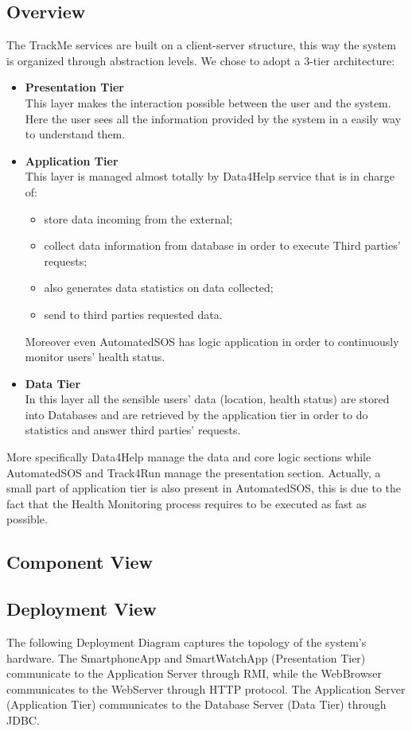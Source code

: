\subsection{Overview}
The TrackMe services are built on a client-server structure, this way the system is organized through abstraction levels.
We chose to adopt a 3-tier architecture:
\begin{itemize}
	\item \textbf{Presentation Tier} \\This layer makes the interaction possible between the user and the system. Here the user sees all the information provided by the system in a easily way to understand them.
	\item \textbf{Application Tier} \\This layer is managed almost totally by Data4Help service that is in charge of:
	\begin{itemize}
		\item store data incoming from the external;
		\item collect data information from database in order to execute Third parties’ requests;
		\item also generates data statistics on data collected;
		\item send to third parties requested data.
	\end{itemize}
	Moreover even AutomatedSOS has logic application in order to continuously monitor users’ health status.
	\item \textbf{Data Tier} \\In this layer all the sensible users’ data (location, health status) are stored into Databases and are retrieved by the application tier in order to do statistics and answer third parties’ requests.
\end{itemize}

More specifically Data4Help manage the data and core logic sections while AutomatedSOS and Track4Run manage the presentation section. Actually, a small part of application tier is also present in AutomatedSOS, this is due to the fact that the Health Monitoring process requires to be executed as fast as possible.

\subsection{Component View}
\subsection{Deployment View}
The following Deployment Diagram captures the topology of the system's hardware.
The SmartphoneApp and SmartWatchApp (Presentation Tier) communicate to the Application Server through RMI, while the WebBrowser communicates to the WebServer through HTTP protocol. The Application Server (Application Tier) communicates to the Database Server (Data Tier) through JDBC.

